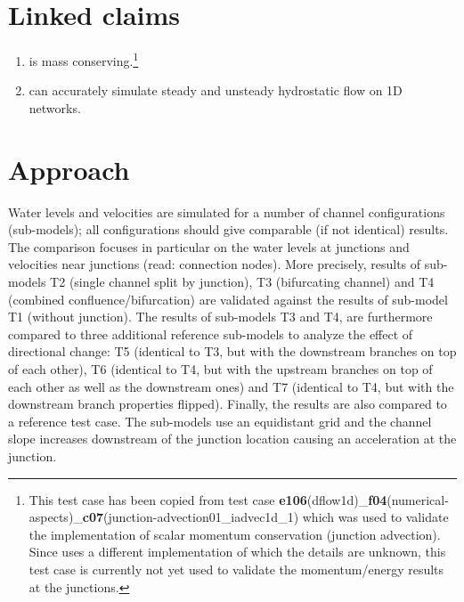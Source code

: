 \section*{Linked claims}
\begin{enumerate}
\item \dflowfm is mass conserving.\footnote{This test case has been copied from \sobekthree test case \textbf{e106}(dflow1d)\_\textbf{f04}(numerical-aspects)\_\textbf{c07}(junction-advection01\_iadvec1d\_1) which was used to validate the implementation of scalar momentum conservation (junction advection).
Since \dflowfm uses a different implementation of which the details are unknown, this test case is currently not yet used to validate the momentum/energy results at the junctions.}
\item \dflowfm can accurately simulate steady and unsteady hydrostatic flow on 1D networks.
\end{enumerate}

\section*{Approach}
Water levels and velocities are simulated for a number of channel configurations (sub-models); all configurations should give comparable (if not identical) results.
The comparison focuses in particular on the water levels at junctions and velocities near junctions (read: connection nodes).
More precisely, results of sub-models T2 (single channel split by junction), T3 (bifurcating channel) and T4 (combined confluence/bifurcation) are validated against the results of sub-model T1 (without junction).
The results of sub-models T3 and T4, are furthermore compared to three additional reference sub-models to analyze the effect of directional change: T5 (identical to T3, but with the downstream branches on top of each other), T6 (identical to T4, but with the upstream branches on top of each other as well as the downstream ones) and T7 (identical to T4, but with the downstream branch properties flipped).
Finally, the results are also compared to a reference \sobekthree test case.
The sub-models use an equidistant grid and the channel slope increases downstream of the junction location causing an acceleration at the junction.

